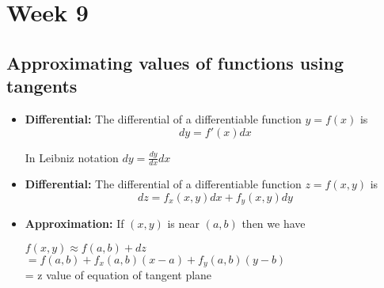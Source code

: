 \documentclass{article}
\begin{document}










  \section{Week 9}
  \subsection*{Approximating values of functions using tangents}
  \begin{itemize}
    \item \textbf{Differential:} The differential of a differentiable function $y = f(x)$ is 
    $$
      dy = f'(x)dx
    $$

    In Leibniz notation $dy = \frac{dy}{dx}dx$

    \item \textbf{Differential:} The differential of a differentiable function $z = f(x,y)$ is 
    $$
    dz = f_x(x,y)dx + f_y(x,y)dy
    $$

    \item \textbf{Approximation:} If $(x,y)$ is near $(a,b)$ then we have
    \begin{center}
      $ f(x,y) \approx f(a,b) + dz $\\
      $= f(a,b) + f_x(a,b)(x-a) +f_y(a,b)(y-b)$\\
      = z value of equation of tangent plane
    \end{center}
  \end{itemize}
\end{document}
